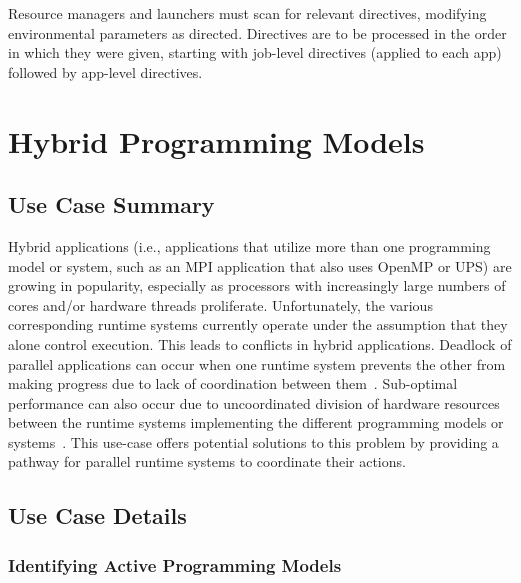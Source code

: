 


Resource managers and launchers must scan for relevant directives, modifying environmental parameters as directed. Directives are to be processed in the order in which they were given, starting with job-level directives (applied to each app) followed by app-level directives.

\section{Hybrid Programming Models}
\label{app:uc-hybrid-programming-models}

\subsection{Use Case Summary}

Hybrid applications (i.e., applications that utilize more than one programming model or system, such as an MPI application that also uses OpenMP or UPS) are growing in popularity, especially as processors with increasingly large numbers of cores and/or hardware threads proliferate. Unfortunately, the various corresponding runtime systems currently operate under the assumption that they alone control execution. This leads to conflicts in hybrid applications. Deadlock of parallel applications can occur when one runtime system prevents the other from making progress due to lack of coordination between them~\cite{2016:Hamidouche}.  Sub-optimal performance can also occur due to uncoordinated division of hardware resources between the runtime systems implementing the different programming models or systems~\cite{ompix-moc,2018:Vallee}. This use-case offers potential solutions to this
problem by providing a pathway for parallel runtime systems to coordinate their actions.

\subsection{Use Case Details}

\subsubsection{Identifying Active Programming Models}

